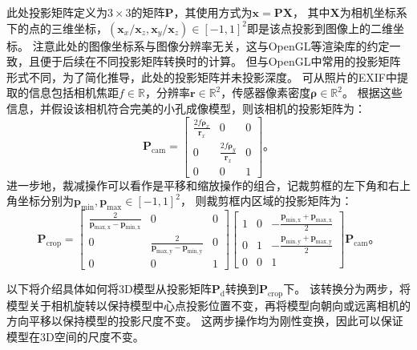 此处投影矩阵定义为$3\times 3$的矩阵$\mathbf{P}$，其使用方式为$\mathbf{x} = \mathbf{P}\mathbf{X}$，
其中$\mathbf{X}$为相机坐标系下的点的三维坐标，$(\mathbf{x}_x/\mathbf{x}_z,\mathbf{x}_y/\mathbf{x}_z)\in[-1,1]^2$即是该点投影到图像上的二维坐标。
注意此处的图像坐标系与图像分辨率无关，这与OpenGL等渲染库的约定一致，且便于后续在不同投影矩阵转换时的计算。
但与OpenGL中常用的投影矩阵形式不同，为了简化推导，此处的投影矩阵并未投影深度。
可从照片的EXIF中提取的信息包括相机焦距$f\in\mathbb{R}$，分辨率$\mathbf{r}\in\mathbb{R}^2$，传感器像素密度$\mathbf{\rho}\in\mathbb{R}^2$。
根据这些信息，并假设该相机符合完美的小孔成像模型，则该相机的投影矩阵为：
\begin{equation}
    \mathbf{P}_\mathrm{cam} = \begin{bmatrix}
        \frac{2f\mathbf{\rho}_x}{\mathbf{r}_x} & 0 & 0 \\
        0 & \frac{2f\mathbf{\rho}_y}{\mathbf{r}_x} & 0 \\
        0 & 0 & 1
    \end{bmatrix}
    \text{。}
\end{equation}
进一步地，裁减操作可以看作是平移和缩放操作的组合，记裁剪框的左下角和右上角坐标分别为$\mathbf{p}_\mathrm{min},\mathbf{p}_\mathrm{max}\in[-1,1]^2$，
则裁剪框内区域的投影矩阵为：
\begin{equation}
    \mathbf{P}_\mathrm{crop} = \begin{bmatrix}
        \frac{2}{\mathbf{p}_\mathrm{max,x}-\mathbf{p}_\mathrm{min,x}} & 0 & 0 \\
        0 & \frac{2}{\mathbf{p}_\mathrm{max,y}-\mathbf{p}_\mathrm{min,y}} & 0 \\
        0 & 0 & 1
    \end{bmatrix}\begin{bmatrix}
        1 & 0 & -\frac{\mathbf{p}_\mathrm{min,x}+\mathbf{p}_\mathrm{max,x}}{2} \\
        0 & 1 & -\frac{\mathbf{p}_\mathrm{min,y}+\mathbf{p}_\mathrm{max,y}}{2} \\
        0 & 0 & 1
    \end{bmatrix}\mathbf{P}_\mathrm{cam}
    \text{。}
\end{equation}

以下将介绍具体如何将3D模型从投影矩阵$\mathbf{P}_\mathrm{d}$转换到$\mathbf{P}_\mathrm{crop}$下。
该转换分为两步，将模型关于相机旋转以保持模型中心点投影位置不变，再将模型向朝向或远离相机的方向平移以保持模型的投影尺度不变。
这两步操作均为刚性变换，因此可以保证模型在3D空间的尺度不变。

